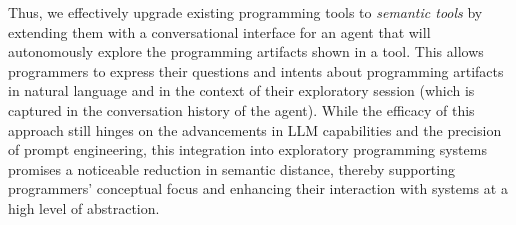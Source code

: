 Thus, we effectively upgrade existing programming tools to \emph{semantic tools} by extending them with a conversational interface for an agent that will autonomously explore the programming artifacts shown in a tool.
This allows programmers to express their questions and intents about programming artifacts in natural language and in the context of their exploratory session (which is captured in the conversation history of the agent).
While the efficacy of this approach still hinges on the advancements in LLM capabilities and the precision of prompt engineering, this integration into exploratory programming systems promises a noticeable reduction in semantic distance, thereby supporting programmers' conceptual focus and enhancing their interaction with systems at a high level of abstraction.

\FloatBarrier
